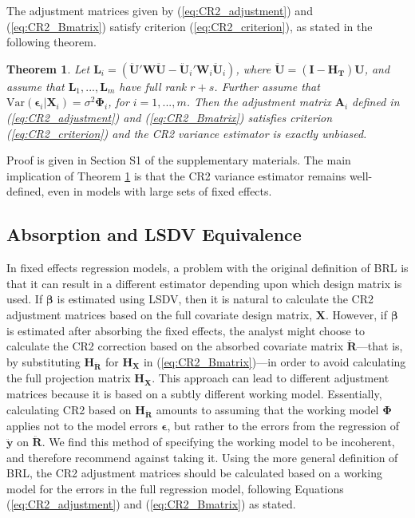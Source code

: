 \documentclass[12pt]{article}\usepackage[]{graphicx}\usepackage[]{color}
\newtheorem{thm}{Theorem}
\newcommand{\Var}{\text{Var}}
\newcommand{\bm}{\mathbf}
\newcommand{\bs}{\boldsymbol}
\begin{document}
The adjustment matrices given by (\ref{eq:CR2_adjustment}) and (\ref{eq:CR2_Bmatrix}) satisfy criterion (\ref{eq:CR2_criterion}), as stated in the following theorem.

\begin{thm}
\label{thm:BRL_FE}
Let $\bm{L}_i = \left(\bm{\ddot{U}}'\bm{W}\bm{\ddot{U}} - \bm{\ddot{U}}_i'\bm{W}_i\bm{\ddot{U}}_i\right)$, where $\bm{\ddot{U}} = \left(\bm{I} - \bm{H_T}\right)\bm{U}$, and assume that $\bm{L}_1,...,\bm{L}_m$ have full rank $r + s$. Further assume that $\Var\left(\bs\epsilon_i\left|\bm{X}_i\right.\right) = \sigma^2 \bs\Phi_i$, for $i = 1,...,m$. Then the adjustment matrix $\bm{A}_i$ defined in (\ref{eq:CR2_adjustment}) and (\ref{eq:CR2_Bmatrix}) satisfies criterion (\ref{eq:CR2_criterion}) and the CR2 variance estimator is exactly unbiased.
\end{thm}

Proof is given in Section S1 of the supplementary materials. The main implication of Theorem \ref{thm:BRL_FE} is that the CR2 variance estimator remains well-defined, even in models with large sets of fixed effects.

\subsection{Absorption and LSDV Equivalence}

In fixed effects regression models, a problem with the original definition of BRL is that it can result in a different estimator depending upon which design matrix is used.
If $\bs\beta$ is estimated using LSDV, then it is natural to calculate the CR2 adjustment matrices based on the full covariate design matrix, $\bm{X}$. However, if $\bs\beta$ is estimated after absorbing the fixed effects, the analyst might choose to calculate the CR2 correction based on the absorbed covariate matrix $\bm{\ddot{R}}$---that is, by substituting $\bm{H_{\ddot{R}}}$ for $\bm{H_X}$ in (\ref{eq:CR2_Bmatrix})---in order to avoid calculating the full projection matrix $\bm{H_X}$. 
This approach can lead to different adjustment matrices because it is based on a subtly different working model. 
Essentially, calculating CR2 based on $\bm{H_{\ddot{R}}}$ amounts to assuming that the working model $\bs\Phi$ applies not to the model errors $\bs\epsilon$, but rather to the errors from the regression of $\bm{\ddot{y}}$ on $\bm{\ddot{R}}$.
We find this method of specifying the working model to be incoherent, and therefore recommend against taking it.
Using the more general definition of BRL, the CR2 adjustment matrices should be calculated based on a working model for the errors in the full regression model, following Equations (\ref{eq:CR2_adjustment}) and (\ref{eq:CR2_Bmatrix}) as stated. 
\end{document}
